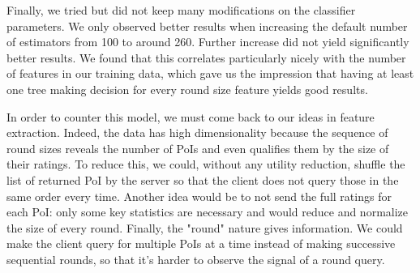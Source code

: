 \documentclass[10pt,conference,compsocconf]{IEEEtran}
\begin{document}
Finally, we tried but did not keep many modifications on the classifier parameters. We only observed better results when increasing the default number of estimators from 100 to around 260. Further increase did not yield significantly better results. We found that this correlates particularly nicely with the number of features in our training data, which gave us the impression that having at least one tree making decision for every round size feature yields good results.

In order to counter this model, we must come back to our ideas in feature extraction. Indeed, the data has high dimensionality because the sequence of round sizes reveals the number of PoIs and even qualifies them by the size of their ratings. To reduce this, we could, without any utility reduction, shuffle the list of returned PoI by the server so that the client does not query those in the same order every time. Another idea would be to not send the full ratings for each PoI: only some key statistics are necessary and would reduce and normalize the size of every round. Finally, the "round" nature gives information. We could make the client query for multiple PoIs at a time instead of making successive sequential rounds, so that it's harder to observe the signal of a round query.


\end{document}
